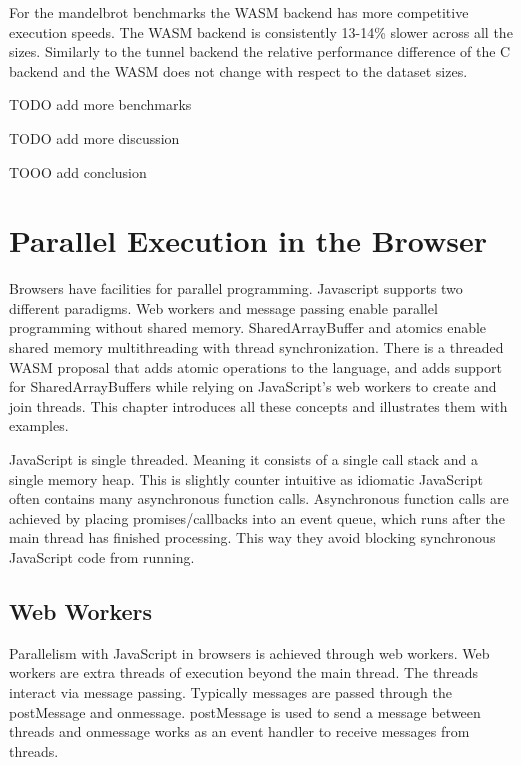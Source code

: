 \documentclass[11pt]{book}
\begin{document}
For the mandelbrot benchmarks the WASM backend has more competitive execution speeds. The WASM backend is consistently 13-14\% slower across all the sizes. Similarly to the tunnel backend the relative performance difference of the C backend and the WASM does not change with respect to the dataset sizes.


TODO add more benchmarks

TODO add more discussion

TOOO add conclusion

\chapter{Parallel Execution in the Browser}


Browsers have facilities for parallel programming. Javascript supports two different paradigms. Web workers and message passing enable parallel programming without shared memory. SharedArrayBuffer and atomics enable shared memory multithreading with thread synchronization. There is a threaded WASM proposal that adds atomic operations to the language, and adds support for SharedArrayBuffers while relying on JavaScript's web workers to create and join threads. This chapter introduces all these concepts and illustrates them with examples.

JavaScript is single threaded. Meaning it consists of a single call stack and a single memory heap. This is slightly counter intuitive as idiomatic JavaScript often contains many asynchronous function calls. Asynchronous function calls are achieved by placing promises/callbacks into an event queue, which runs after the main thread has finished processing. This way they avoid blocking synchronous JavaScript code from running. 



\section{Web Workers}
Parallelism with JavaScript in browsers is achieved through web workers. Web workers are extra threads of execution beyond the main thread. The threads interact via message passing. Typically messages are passed through the postMessage and onmessage. postMessage is used to send a message between threads and onmessage works as an event handler to receive messages from threads. 
\end{document}

